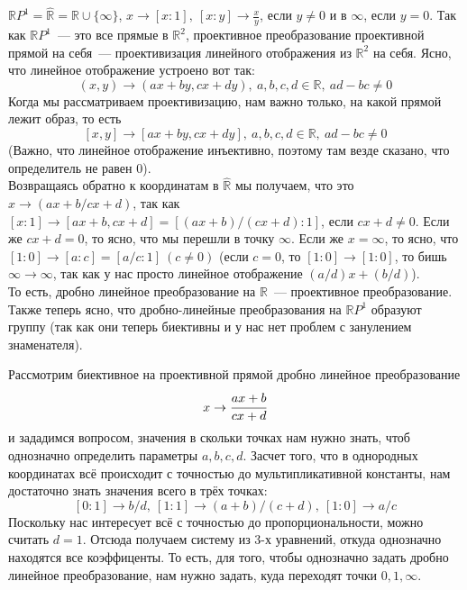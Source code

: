 \documentclass[11pt]{report}
\begin{document}
    \begin{example}
        $ \mathbb{R}P^1 = \widehat{\mathbb{R}} = \mathbb{R} \cup \{ \infty \}$, $x \to [x : 1], \ [x : y] \to \frac{x}{y}$, если $y \neq 0$ и в $\infty$, если $y = 0$.
        Так как $\mathbb{R}P^1$~--- это все прямые в $\mathbb{R}^2$, проективное преобразование проективной прямой на себя~--- проективизация линейного отображения из $\mathbb{R}^2$ на себя. Ясно, что линейное отображение устроено вот так:
        \[ (x,  y) \to (ax + by , cx + dy), \ a, b, c, d \in \mathbb{R}, \ ad - bc \neq 0 \]
        Когда мы рассматриваем проективизацию, нам важно только, на какой прямой лежит образ, то есть
        \[ [x,  y] \to [ax + by , cx + dy], \ a, b, c, d \in \mathbb{R}, \ ad - bc \neq 0 \]
        (Важно, что линейное отображение инъективно, поэтому там везде сказано, что определитель не равен 0).\\
        Возвращаясь обратно к координатам в $\widehat{\mathbb{R}}$ мы получаем, что это $x \to (ax + b / cx + d)$, так как $[x : 1] \to [ax + b, cx + d] = [(ax + b) / (cx + d) : 1]$, если $cx + d \neq 0$. Если же $cx + d = 0$, то ясно, что мы перешли в точку $\infty$. Если же $x = \infty$, то ясно, что $[1 : 0] \to [a : c] = [a / c : 1] \ (c \neq 0)$ (если $c = 0$, то $[1 : 0] \to [1 : 0]$, то бишь $\infty \to \infty$, так как у нас просто линейное отображение $(a /d)x + (b / d)$).\\
        То есть, дробно линейное преобразование на $\mathbb{R}$~--- проективное преобразование. Также теперь ясно, что дробно-линейные преобразования на $\mathbb{R}P^1$ образуют группу (так как они теперь биективны и у нас нет проблем с занулением знаменателя).
    \end{example}

    \begin{example}
    Рассмотрим  биективное на проективной прямой дробно линейное преобразование
        \[ x \to \cfrac{ax + b}{cx + d}\]
        и зададимся вопросом, значения в скольки точках нам нужно знать, чтоб однозначно определить параметры $a, b, c, d$. Засчет того, что в однородных координатах всё происходит с точностью до мультипликативной константы, нам достаточно знать значения всего в трёх точках:
        \[ [0 : 1] \to b / d, \ [1 : 1] \to (a + b) / (c + d), \ [1 : 0] \to a / c\]
        Поскольку нас интересует всё с точностью до пропорциональности, можно считать $d = 1$. Отсюда получаем систему из 3-х уравнений, откуда однозначно находятся все коэффиценты. То есть, для того, чтобы однозначно задать дробно линейное преобразование, нам нужно задать, куда переходят точки $0, 1, \infty$.
    \end{example}
\end{document}
